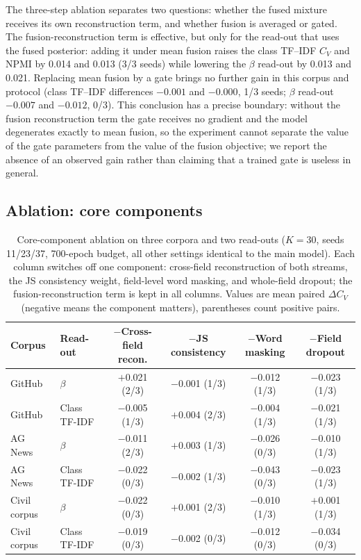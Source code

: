 \documentclass[Journal,letterpaper]{ascelike-new}
\begin{document}
The three-step ablation separates two questions: whether the fused mixture receives its own
reconstruction term, and whether fusion is averaged or gated. The fusion-reconstruction term is
effective, but only for the read-out that uses the fused posterior: adding it under mean fusion
raises the class TF--IDF $C_V$ and NPMI by 0.014 and 0.013 (3/3 seeds) while lowering the $\beta$
read-out by 0.013 and 0.021. Replacing mean fusion by a gate brings no further gain in this corpus
and protocol (class TF--IDF differences $-0.001$ and $-0.000$, 1/3 seeds; $\beta$ read-out
$-0.007$ and $-0.012$, 0/3). This conclusion has a precise boundary: without the fusion
reconstruction term the gate receives no gradient and the model degenerates exactly to mean fusion,
so the experiment cannot separate the value of the gate parameters from the value of the fusion
objective; we report the absence of an observed gain rather than claiming that a trained gate is
useless in general.

\subsection{Ablation: core components}

\begin{table}[t]
\centering
\caption{Core-component ablation on three corpora and two read-outs ($K=30$, seeds 11/23/37, 700-epoch budget, all other settings identical to the main model). Each column switches off one component: cross-field reconstruction of both streams, the JS consistency weight, field-level word masking, and whole-field dropout; the fusion-reconstruction term is kept in all columns. Values are mean paired $\Delta C_V$ (negative means the component matters), parentheses count positive pairs.}
\label{tab:core-ablation}
\small
\setlength{\tabcolsep}{5pt}
\begin{tabular}{llcccc}
\toprule
Corpus & Read-out & $-$Cross-field recon. & $-$JS consistency & $-$Word masking & $-$Field dropout \\
\midrule
GitHub & $\beta$ & $+$0.021 (2/3) & $-$0.001 (1/3) & $-$0.012 (1/3) & $-$0.023 (1/3) \\
GitHub & Class TF-IDF & $-$0.005 (1/3) & $+$0.004 (2/3) & $-$0.004 (1/3) & $-$0.021 (1/3) \\
\midrule
AG News & $\beta$ & $-$0.011 (2/3) & $+$0.003 (1/3) & $-$0.026 (0/3) & $-$0.010 (1/3) \\
AG News & Class TF-IDF & $-$0.022 (0/3) & $-$0.002 (1/3) & $-$0.043 (0/3) & $-$0.023 (1/3) \\
\midrule
Civil corpus & $\beta$ & $-$0.022 (0/3) & $+$0.001 (2/3) & $-$0.010 (1/3) & $+$0.001 (1/3) \\
Civil corpus & Class TF-IDF & $-$0.019 (0/3) & $-$0.002 (0/3) & $-$0.012 (0/3) & $-$0.034 (0/3) \\
\bottomrule
\end{tabular}
\end{table}
\end{document}
